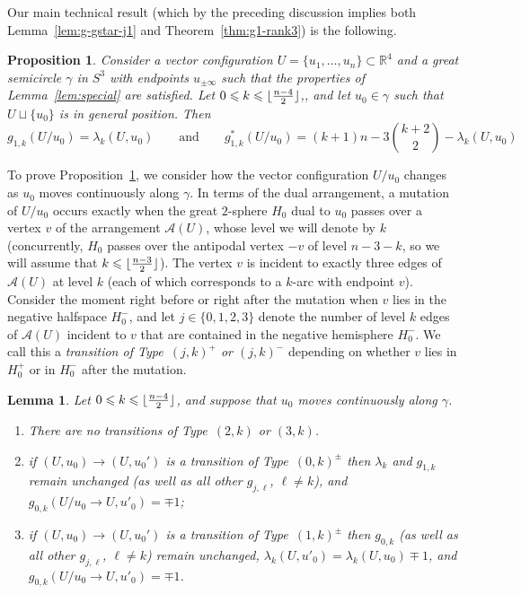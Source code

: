 \documentclass[11pt]{article}
\newtheorem{lemma}[theorem]{Lemma}
\newtheorem{proposition}[theorem]{Proposition}
\renewcommand{\leq}{\leqslant}
\newcommand{\R}{\mathbb{R}}
\DeclarePairedDelimiter\floor{\lfloor}{\rfloor}
\begin{document}
Our main technical result (which by the preceding discussion implies both Lemma~\ref{lem:g-gstar-j1} and Theorem~\ref{thm:g1-rank3}) is the following. 
\begin{proposition}
\label{prop:lambda-g}
Consider a vector configuration $U=\{u_1,\dots,u_n\} \subset \R^4$ and a great semicircle $\gamma$ in $S^3$ with endpoints $u_{\pm \infty}$ such that the properties of Lemma~\ref{lem:special} are satisfied. 
%
Let $0\leq k\leq \floor{\frac{n-4}{2}}$,, and let $u_0\in \gamma$ such that $U\sqcup \{u_0\}$ is in general position. Then
\[
g_{1,k}(U/u_0)=\lambda_k(U,u_0)\qquad \textrm{and}\qquad g^*_{1,k}(U/u_0)=(k+1)n-3\binom{k+2}{2}-\lambda_k(U,u_0)
\]
\end{proposition}
%
To prove Proposition~\ref{prop:lambda-g}, we consider how the vector configuration $U/u_0$ changes as $u_0$ moves continuously along $\gamma$. In terms of the dual arrangement, a mutation of $U/u_0$ occurs exactly when the great $2$-sphere $H_0$ dual to $u_0$ passes over a vertex $v$ of the arrangement 
$\mathcal{A}(U)$, whose level we will denote by $k$ (concurrently, $H_0$ passes over the antipodal vertex $-v$ of level $n-3-k$, so we will assume that $k\leq \floor{\frac{n-3}{2}}$). The vertex $v$ is incident to exactly three edges of $\mathcal{A}(U)$ at level $k$ (each of which corresponds to a $k$-arc with endpoint $v$). Consider the moment right before or right after the mutation when $v$ lies in the negative halfspace $H_0^-$, and let $j\in \{0,1,2,3\}$ denote the number of level $k$ edges of $\mathcal{A}(U)$ incident to $v$ that are contained in the negative hemisphere $H_0^-$. We call this a \emph{transition of Type~$(j,k)^+$ or $(j,k)^-$} depending on whether $v$ lies in $H_0^+$ or in $H_0^-$ after the mutation.
%
\begin{lemma}
\label{lem:transitions}
Let $0\leq k\leq \floor{\frac{n-4}{2}}$, and suppose that $u_0$ moves continuously along $\gamma$. 
\begin{enumerate}
\item There are no transitions of Type~$(2,k)$ or $(3,k)$.
\item if $(U,u_0)\to (U,u_0')$ is a transition of Type~$(0,k)^{\pm}$ then $\lambda_k$ and $g_{1,k}$ remain unchanged (as well as all other $g_{j,\ell}$, $\ell \neq k$), and $g_{0,k}(U/u_0 \to U,u'_0) = \mp 1$; 
\item if $(U,u_0)\to (U,u_0')$ is a transition of Type~$(1,k)^{\pm}$ then $g_{0,k}$  (as well as all other $g_{j,\ell}$, $\ell \neq k$) remain unchanged, $\lambda_k(U,u'_0)=\lambda_k(U,u_0) \mp 1$, and $g_{0,k}(U/u_0 \to U,u'_0) = \mp 1$.
\end{enumerate}
\end{lemma}
\end{document}
